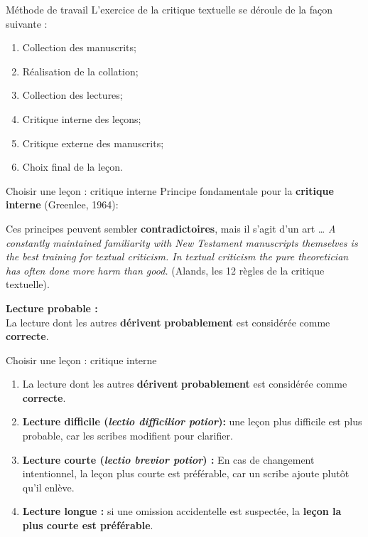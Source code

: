 \documentclass[11pt]{beamer}
\begin{document}
\begin{frame}{Méthode de travail}
L'exercice de la critique textuelle se déroule de la façon suivante :
    \begin{enumerate}
        \item Collection des manuscrits;
        \item Réalisation de la collation;
        \item Collection des lectures;
        \item Critique interne des leçons;
        \item Critique externe des manuscrits;
        \item Choix final de la leçon.
    \end{enumerate}
\end{frame}



\begin{frame}{Choisir une leçon : critique interne}
    Principe fondamentale pour la \textbf{critique interne} (Greenlee, 1964):\\
        \begin{alertblock}{}
        Ces principes peuvent sembler \textbf{contradictoires}, mais il s'agit d'un art \dots
        \textit{A constantly maintained familiarity with New Testament manuscripts themselves is the best training for textual criticism. In textual criticism the pure theoretician has often done more harm than good.} (Alands, les 12 règles de la critique textuelle).
    \end{alertblock}
    
\begin{block}{}
    \textbf{Lecture  probable :} \\
    
    La lecture dont les autres \textbf{dérivent} \textbf{probablement} est considérée comme \textbf{correcte}.
\end{block}
\end{frame}

\begin{frame}{Choisir une leçon : critique interne}

\begin{enumerate}
\item La lecture dont les autres \textbf{dérivent} \textbf{probablement} est considérée comme \textbf{correcte}.

    \item \textbf{Lecture difficile (\textit{lectio difficilior potior}):} une leçon plus difficile est plus probable, car les scribes modifient pour clarifier.
    
    \item \textbf{Lecture courte (\textit{lectio brevior potior}) :} 
    En cas de changement intentionnel, la leçon plus courte est préférable, car un scribe ajoute plutôt qu'il enlève.

    \item \textbf{Lecture longue :} si une omission accidentelle est suspectée, la \textbf{leçon la plus courte est préférable}.
\end{enumerate}

\end{frame}
\end{document}
